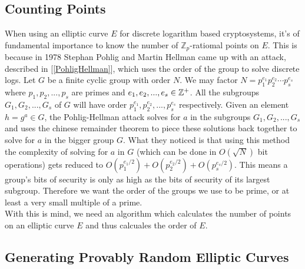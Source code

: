 \subsection{Counting Points}

When using an elliptic curve $E$ for discrete logarithm based cryptosystems, it's of fundamental importance to know the number of $\mathbb{Z}_p$-ratiomal points on $E$. This is because in 1978 Stephan Pohlig and Martin Hellman came up with an attack, described in [\ref{PohligHellman}], which uses the order of the group to solve discrete logs. Let $G$ be a finite cyclic group with order $N$. We may factor $N = p_1^{e_1}p_2^{e_2} \cdots p_s^{e_s}$ where $p_1,p_2,...,p_s$ are primes and $e_1,e_2,...,e_s \in \mathbb{Z}^+ $. All the subgroups $G_1,G_2,...,G_s$ of $G$ will have order $p_1^{e_1},p_2^{e_2},...,p_s^{e_s}$ respectively. Given an element $h = g^a \in G$, the Pohlig-Hellman attack solves for $a$  in the subgroups $G_1,G_2,...,G_s$ and uses the chinese remainder theorem to piece these solutions back together to solve for $a$ in the bigger group $G$. What they noticed is that using this method the complexity of solving for $a$ in $G$ (which can be done in $O(\sqrt{N})$ bit operations) gets reduced to $O(p_1^{e_1/2}) + O(p_2^{e_2/2}) + O(p_s^{e_s/2})$. This means a group's bits of security is only as high as the bits of security of its largest subgroup. Therefore we want the order of the groups we use to be prime, or at least a very small multiple of a prime. \\

With this is mind, we need an algorithm which calculates the number of points on an elliptic curve $E$ and thus calcuales the order of $E$. 



\subsection{Generating Provably Random Elliptic Curves}